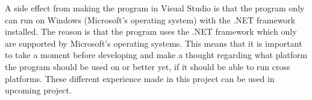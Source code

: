 A side effect from making the program in Visual Studio is that the program only can run on Windows (Microsoft's operating system) with the .NET framework installed. The reason is that the program uses the .NET framework which only are supported by Microsoft's operating systems.
This means that it is important to take a moment before developing and make a thought regarding what platform the program should be used on or better yet, if it should be able to run cross platforms.
These different experience made in this project can be used in upcoming project.